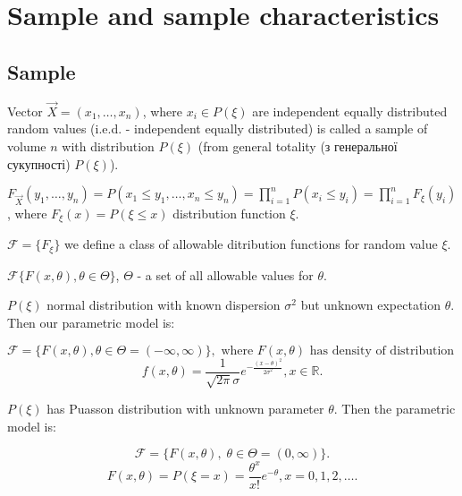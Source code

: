 \newpage

\section{Sample and sample characteristics}

\subsection{Sample}

\begin{definition}
Vector \(\vec{X} = \left( x_1, \ldots, x_n \right)\), where \(x_i \in P(\xi)\)
    are independent equally distributed random values (i.e.d. - independent 
    equally distributed) is called
    a sample of volume $n$ with distribution $P(\xi)$ (from general
    totality (з генеральної сукупності) $P(\xi)$).
\end{definition}
\begin{remark}
    $F_{\vec{X}} \left( y_1, \ldots, y_n \right) = P(x_1 \leq y_1,
    \ldots, x_n \leq y_n) = \prod_{i=1}^{n} P(x_i \leq y_i) =
    \prod_{i=1}^{n} F_{\xi} (y_i) $, where $F_{\xi}(x) = P(\xi \leq x)$
    distribution function $\xi$.
\end{remark}
$\mathcal{F} = \{F_{\xi}\}$ we define a class of allowable ditribution
functions for random value $\xi$.

\(\mathcal{F} \{F(x, \theta), \theta \in \Theta\}\), $\Theta$ - a set of all allowable values for $\theta$.

\begin{example}
    $P(\xi)$ normal distribution with known dispersion $\sigma^2$ but unknown expectation $\theta$. Then our parametric model is:

    \[
    \mathcal{F} = \{F(x, \theta), \theta \in \Theta = (-\infty, \infty)\}, \text{ where } F(x, \theta) \text{ has density of distribution }
    \] 
\[
f(x, \theta) = \frac{1}{\sqrt{2 \pi} \sigma} e^{-\frac{(x-\theta)^2}{2\sigma^2}}, x \in \mathbb{R}
.\] 
\end{example}
\begin{example}
    $P(\xi)$ has Puasson distribution with unknown parameter $\theta$.
    Then the parametric model is:

    \[
    \mathcal{F} = \{F(x, \theta), \; \theta \in \Theta = (0, \infty)\}
    .\] 
    \[
    F(x, \theta) = P(\xi = x) = \frac{\theta^{x}}{x!} e^{-\theta}, x = 0,1,2,\ldots
    .\] 
\end{example}

